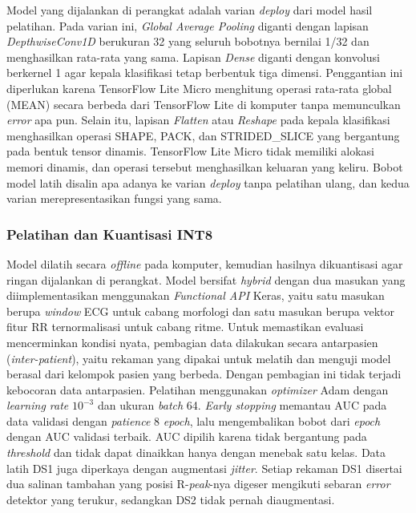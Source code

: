 Model yang dijalankan di perangkat adalah varian \textit{deploy} dari model
hasil pelatihan. Pada varian ini, \textit{Global Average Pooling} diganti dengan
lapisan \textit{DepthwiseConv1D} berukuran 32 yang seluruh bobotnya bernilai
1/32 dan menghasilkan rata-rata yang sama. Lapisan \textit{Dense}
diganti dengan konvolusi berkernel 1 agar kepala klasifikasi tetap berbentuk
tiga dimensi. Penggantian ini diperlukan karena TensorFlow Lite Micro menghitung
operasi rata-rata global (MEAN) secara berbeda dari TensorFlow Lite di komputer tanpa
memunculkan \textit{error} apa pun. Selain itu, lapisan \textit{Flatten} atau \textit{Reshape}
pada kepala klasifikasi menghasilkan operasi SHAPE, PACK, dan STRIDED\_SLICE yang
bergantung pada bentuk tensor dinamis. TensorFlow Lite Micro tidak memiliki
alokasi memori dinamis, dan operasi tersebut menghasilkan keluaran yang keliru. Bobot model latih disalin apa adanya ke varian
\textit{deploy} tanpa pelatihan ulang, dan kedua varian merepresentasikan
fungsi yang sama.

\subsubsection{Pelatihan dan Kuantisasi INT8}

Model dilatih secara \textit{offline} pada komputer, kemudian hasilnya dikuantisasi agar ringan dijalankan di perangkat. Model bersifat \textit{hybrid} dengan dua masukan yang diimplementasikan menggunakan \textit{Functional API} Keras, yaitu satu masukan berupa \textit{window} ECG untuk cabang morfologi dan satu masukan berupa vektor fitur RR ternormalisasi untuk cabang ritme. Untuk memastikan evaluasi mencerminkan kondisi nyata, pembagian data dilakukan secara antarpasien (\textit{inter-patient}), yaitu rekaman yang dipakai untuk melatih dan menguji model berasal dari kelompok pasien yang berbeda. Dengan pembagian ini tidak terjadi kebocoran data antarpasien. Pelatihan menggunakan \textit{optimizer} Adam dengan \textit{learning rate} $10^{-3}$ dan ukuran \textit{batch} 64. \textit{Early stopping} memantau AUC pada data validasi dengan \textit{patience} 8 \textit{epoch}, lalu mengembalikan bobot dari \textit{epoch} dengan AUC validasi terbaik. AUC dipilih karena tidak bergantung pada \textit{threshold} dan tidak dapat dinaikkan hanya dengan menebak satu kelas. Data latih DS1 juga diperkaya dengan augmentasi \textit{jitter}. Setiap rekaman DS1 disertai dua salinan tambahan yang posisi R-\textit{peak}-nya digeser mengikuti sebaran \textit{error} detektor yang terukur, sedangkan DS2 tidak pernah diaugmentasi.

